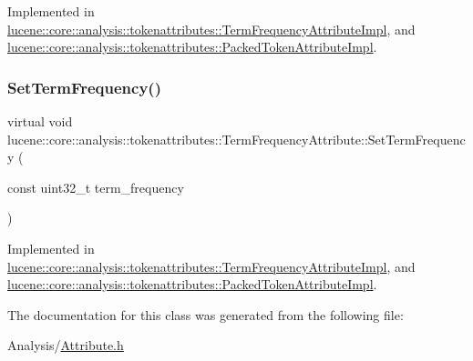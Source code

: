 Implemented in \mbox{\hyperlink{classlucene_1_1core_1_1analysis_1_1tokenattributes_1_1TermFrequencyAttributeImpl_adfd47f9d692a2fbe7a48d590f8c585cb}{lucene\+::core\+::analysis\+::tokenattributes\+::\+Term\+Frequency\+Attribute\+Impl}}, and \mbox{\hyperlink{classlucene_1_1core_1_1analysis_1_1tokenattributes_1_1PackedTokenAttributeImpl_a82aff8ded68bf64ab156382ca6862db2}{lucene\+::core\+::analysis\+::tokenattributes\+::\+Packed\+Token\+Attribute\+Impl}}.

\mbox{\label{classlucene_1_1core_1_1analysis_1_1tokenattributes_1_1TermFrequencyAttribute_aeb8ef8cc3f3ab6c8678b491ac3e1b682}} 
\subsubsection{\texorpdfstring{Set\+Term\+Frequency()}{SetTermFrequency()}}
{\footnotesize\ttfamily virtual void lucene\+::core\+::analysis\+::tokenattributes\+::\+Term\+Frequency\+Attribute\+::\+Set\+Term\+Frequency (\begin{DoxyParamCaption}\item[{const uint32\+\_\+t}]{term\+\_\+frequency }\end{DoxyParamCaption})\hspace{0.3cm}{\ttfamily [pure virtual]}}



Implemented in \mbox{\hyperlink{classlucene_1_1core_1_1analysis_1_1tokenattributes_1_1TermFrequencyAttributeImpl_a7662b5bc48f8914a3df96ea22b742e5f}{lucene\+::core\+::analysis\+::tokenattributes\+::\+Term\+Frequency\+Attribute\+Impl}}, and \mbox{\hyperlink{classlucene_1_1core_1_1analysis_1_1tokenattributes_1_1PackedTokenAttributeImpl_a4d9dfc6cc7c825d42789245b8ca003c4}{lucene\+::core\+::analysis\+::tokenattributes\+::\+Packed\+Token\+Attribute\+Impl}}.



The documentation for this class was generated from the following file\+:\begin{DoxyCompactItemize}
\item 
Analysis/\mbox{\hyperlink{Analysis_2Attribute_8h}{Attribute.\+h}}\end{DoxyCompactItemize}
